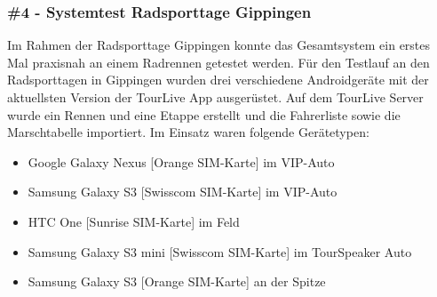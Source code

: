\subsubsection{\#4 - Systemtest Radsporttage Gippingen}
\label{sec:testberichtgippingen}
Im Rahmen der Radsporttage Gippingen konnte das Gesamtsystem ein erstes Mal praxisnah an einem Radrennen getestet werden. Für den Testlauf an den Radsporttagen in Gippingen wurden drei verschiedene Androidgeräte mit der aktuellsten Version der TourLive App ausgerüstet. Auf dem TourLive Server wurde ein Rennen und eine Etappe erstellt und die Fahrerliste sowie die Marschtabelle importiert. Im Einsatz waren folgende Gerätetypen:
\begin{itemize} [noitemsep,topsep=0pt]
	\item Google Galaxy Nexus [Orange SIM-Karte] im VIP-Auto
	\item Samsung Galaxy S3 [Swisscom SIM-Karte] im VIP-Auto
	\item HTC One [Sunrise SIM-Karte] im Feld
	\item Samsung Galaxy S3 mini [Swisscom SIM-Karte] im TourSpeaker Auto
	\item Samsung Galaxy S3 [Orange SIM-Karte] an der Spitze
\end{itemize}

